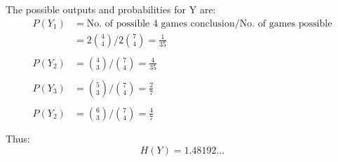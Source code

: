 \documentclass[12pt]{article}
\begin{document}
\begin{enumerate}
    The possible outputs and probabilities for Y are: \\
    \begin{align*}
        P(Y_1) &= \text{No. of possible 4 games conclusion} / \text{No. of games possible}\\
        &= 2{4 \choose 4} / 2 {7 \choose 4} = \frac{1}{35}\\
        \\
        P(Y_2) &= {4 \choose 3} / {7 \choose 4} = \frac{4}{35}\\
        \\
        P(Y_3) &= {5 \choose 3} / {7 \choose 4} = \frac{2}{7}\\
        \\
        P(Y_2) &= {6 \choose 3} / {7 \choose 4} = \frac{4}{7}\\
        \\
    \end{align*}
    Thus:
    \begin{equation*}
        H(Y) = 1.48192...
    \end{equation*}


\end{enumerate}
\end{document}

